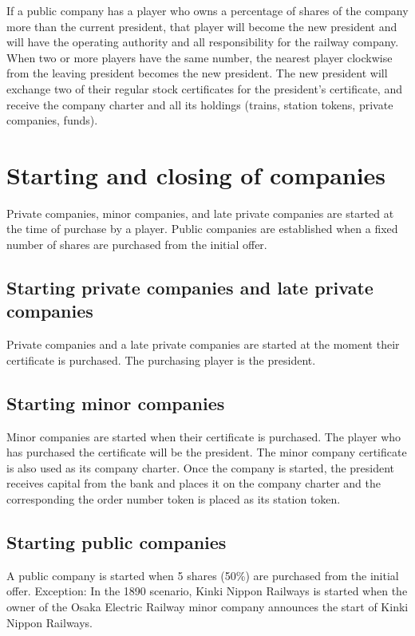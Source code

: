 \documentclass{article}
\begin{document}
\begin{CJK}{UTF8}{min}
\begin{multicols}{2}
If a public company has a player who owns a percentage of shares of
the company more than the current president, that player will become
the new president and will have the operating authority and all
responsibility for the railway company. When two or more players have
the same number, the nearest player clockwise from the leaving
president becomes the new president. The new president will exchange
two of their regular stock certificates for the president's
certificate, and receive the company charter and all its holdings
(trains, station tokens, private companies, funds).


\section{Starting and closing of companies}\label{sec:starting-companies}
Private companies, minor companies, and late private companies are
started at the time of purchase by a player. Public companies are
established when a fixed number of shares are purchased from the
initial offer.

\subsection{Starting private companies and late private companies}
Private companies and a late private companies are started at the
moment their certificate is purchased. The purchasing player is the
president.

\subsection{Starting minor companies}
Minor companies are started when their certificate is
purchased. The player who has purchased the certificate will be the
president. The minor company certificate is also used as its company
charter. Once the company is started, the
president receives capital from the bank and places it on the company
charter and the corresponding the order number token is placed as its
station token.

\subsection{Starting public companies}
A public company is started when 5 shares (50\%) are purchased from
the initial offer. Exception: In the 1890 scenario, Kinki Nippon
Railways is started when the owner of the Osaka Electric Railway minor
company announces the start of Kinki Nippon Railways.


\end{multicols}
\end{CJK}
\end{document}
